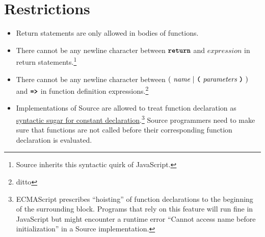 \section*{Restrictions}

\begin{itemize}
\item Return statements are only allowed in bodies of functions.
\item There cannot be any newline character between
  $\textbf{\texttt{return}}$ and $\textit{expression}$ in return statements.\footnote{
  Source inherits this syntactic quirk of JavaScript.}
\item There cannot be any newline character between
  $(\ \textit{name}\ | \ \textbf{\texttt{(}}\ \textit{parameters}\ \textbf{\texttt{)}}\ )$
  and
  $\texttt{\textbf{=>}}$ in function definition expressions.\footnote{ditto}
\item Implementations of Source are allowed to treat function
  declaration as \href{https://source-academy.github.io/sicp/chapters/1.3.2.html\#footnote-2}{
    syntactic sugar for constant declaration}.\footnote{ECMAScript prescribes ``hoisting''
    of function declarations to the beginning of the surrounding block. Programs that rely
    on this feature will run fine in JavaScript but might encounter a runtime error ``Cannot
    access name before initialization'' in a Source implementation.}
  Source programmers need
  to make sure that functions are not called before their corresponding function declaration
  is evaluated.

\end{itemize}
